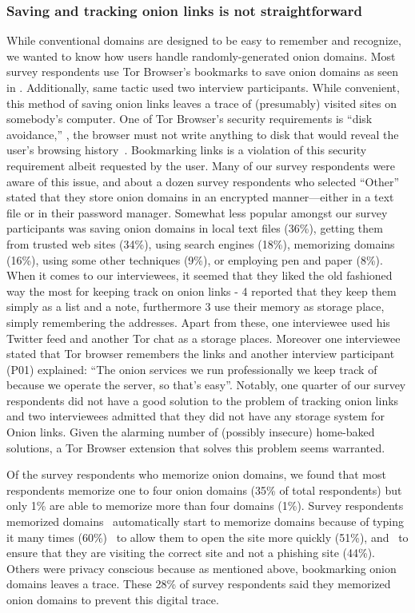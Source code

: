 \subsubsection{Saving and tracking onion links is not straightforward}
While conventional domains are designed to be easy to remember and recognize, we wanted to know how users handle randomly-generated onion domains. Most survey respondents use Tor Browser's bookmarks to save onion domains as seen in . Additionally, same tactic used two interview participants.   While
convenient, this method of saving onion links leaves a trace of (presumably) visited sites on somebody's
computer.  One of Tor Browser's security requirements is ``disk avoidance,''
\ie, the browser must not write anything to disk that would reveal the user's
browsing history~\cite[\S~2.1]{Perry2017a}.  Bookmarking links is a violation of
this security requirement albeit requested by the user.  Many of our survey respondents
were aware of this issue, and about a dozen survey respondents who selected ``Other'' stated that they store onion domains in an encrypted manner---either in a text file or in their password manager.  Somewhat less popular amongst our survey participants was saving onion domains in local text files (36\%), getting them from trusted web sites (34\%), using search engines (18\%), memorizing domains (16\%), using some other 
techniques (9\%), or employing pen and paper (8\%).  When it comes to our interviewees, it seemed that they liked the old fashioned way the most for keeping track on onion links  - 4 reported that they keep them simply as a list and a note, furthermore 3 use their memory as storage place, simply remembering the addresses. Apart from these, one interviewee used his Twitter feed and another Tor chat as a storage places. Moreover one interviewee stated that Tor browser remembers the links and another interview participant (P01) explained: “The onion services we run professionally we keep track of because we operate the server, so that's easy”. Notably, one quarter of our survey
respondents did not have a good solution to the problem of tracking onion links and  two interviewees admitted that they did not have any storage system for Onion links.
Given the alarming
number of (possibly insecure) home-baked solutions, a Tor Browser extension that
solves this problem seems warranted.

Of the survey respondents who memorize onion domains, we found that most respondents
memorize one to four onion domains (35\% of total respondents) but only 1\% are able to memorize more than four domains (1\%).   Survey respondents memorized domains \first~automatically start to memorize domains
because of typing it many times (60\%)
\second~to allow them to open the site more
quickly (51\%), and \third~to ensure that they are visiting the correct site and
not a phishing site (44\%). Others were privacy conscious because as mentioned above,
bookmarking onion domains leaves a trace. These 28\% of survey respondents said
they memorized onion domains to prevent this digital trace.

